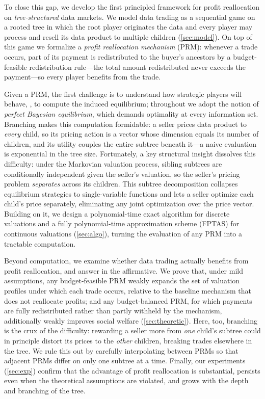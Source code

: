 To close this gap, we develop the first principled framework for profit reallocation on \emph{tree-structured} data markets.
We model data trading as a sequential game on a rooted tree in which the root player originates the data and every player may process and resell its data product to multiple children (\cref{sec:model}). 
On top of this game we formalize a \emph{profit reallocation mechanism} (PRM): whenever a trade occurs, part of its payment is redistributed to the buyer's ancestors by a budget-feasible redistribution rule---the total amount redistributed never exceeds the payment---so every player benefits from the trade.

Given a PRM, the first challenge is to understand how strategic players will behave, \ie, to compute the induced equilibrium; throughout we adopt the notion of \emph{perfect Bayesian equilibrium}, which demands optimality at every information set.
Branching makes this computation formidable: a seller prices data product to \emph{every} child, so its pricing action is a vector whose dimension equals its number of children, and its utility couples the entire subtree beneath it---a naive evaluation is exponential in the tree size.
Fortunately, a key structural insight dissolves this difficulty: under the Markovian valuation process, sibling subtrees are conditionally independent given the seller's valuation, so the seller's pricing problem \emph{separates} across its children.
This subtree decomposition collapses equilibrium strategies to single-variable functions and lets a seller optimize each child's price separately, eliminating any joint optimization over the price vector.
Building on it, we design a polynomial-time exact algorithm for discrete valuations and a fully polynomial-time approximation scheme (FPTAS) for continuous valuations (\cref{sec:algo}), turning the evaluation of any PRM into a tractable computation.

Beyond computation, we examine whether data trading actually benefits from profit reallocation, and answer in the affirmative.
We prove that, under mild assumptions, any budget-feasible PRM weakly expands the set of valuation profiles under which each trade occurs, relative to the baseline mechanism that does not reallocate profits; and any budget-balanced PRM, for which payments are fully redistributed rather than partly withheld by the mechanism, additionally weakly improves social welfare (\cref{sec:theoretic}).
Here, too, branching is the crux of the difficulty: rewarding a seller more from \emph{one} child's subtree could in principle distort its prices to the \emph{other} children, breaking trades elsewhere in the tree. We rule this out by carefully interpolating between PRMs so that adjacent PRMs differ on only one subtree at a time.
Finally, our experiments (\cref{sec:exp}) confirm that the advantage of profit reallocation is substantial, persists even when the theoretical assumptions are violated, and grows with the depth and branching of the tree.

